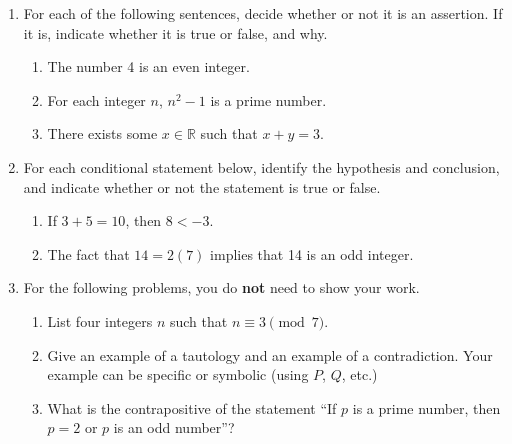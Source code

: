 \documentclass[12pt]{article}
\newcommand{\points}[1]{\marginpar{\hspace{24pt}[#1]}}
\newcommand{\R}{\mathbb{R}}
\begin{document}
\begin{enumerate}
\item For each of the following sentences, decide whether or not it is an assertion. If it is, indicate whether it is true or false, and why.
\begin{enumerate}
\item The number 4 is an even integer. \points{2}

\vspace{1.25in}

\item For each integer $n$, $n^2-1$ is a prime number.\points{2}

\vspace{1.25in}

\item There exists some $x\in\R$ such that $x+y=3$. \points{2}

\vspace{1in}
\end{enumerate}

\item For each conditional statement below, identify the hypothesis and conclusion, and indicate whether or not the statement is true or false.
\begin{enumerate}
\item If $3+5=10$, then $8<-3$. \points{2}

\vspace{1.25in}

\item The fact that $14=2(7)$ implies that 14 is an odd integer. \points{2}
\end{enumerate}
\newpage

\item For the following problems, you do {\bf not} need to show your work.
\begin{enumerate}
\item List four integers $n$ such that $n\equiv 3 \pmod{7}$. \points{2}

\vspace{1.25in}

\item Give an example of a tautology and an example of a contradiction. Your example can be specific or symbolic (using $P$, $Q$, etc.)\points{2}

\vspace{1.25in}

\item What is the contrapositive of the statement ``If $p$ is a prime number, then $p=2$ or $p$ is an odd number''?\points{2}


\end{enumerate}
\end{enumerate}
\end{document}
